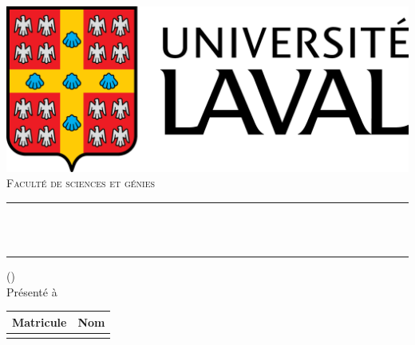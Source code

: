 \thispagestyle{empty}
\begin{titlepage}
	\begin{center}
		\includegraphics[scale=0.2]{img/logo_ulaval.png}
		\\[0.75cm] \textsc{\normalsize Faculté de sciences et génies}\\[1.2cm]

		\vfill

		\rule{\linewidth}{0.5mm}\\[0.4cm] {\huge\bfseries \titre}\\[0.4cm] \rule{\linewidth}{0.5mm}

		\vfill

		\cours (\codeCours) \\[1cm] Présenté à \\ {\bfseries \remiseA}

		\vfill

		\begin{table}[H]
			\centering
			\begin{tabular}{|c|c|}
				\hline
				\textbf{Matricule} & \textbf{Nom}   \\
				\hline
				\text{\NI}         & \text{\auteur} \\
				\hline
			\end{tabular}
		\end{table}
	\end{center}
\end{titlepage}